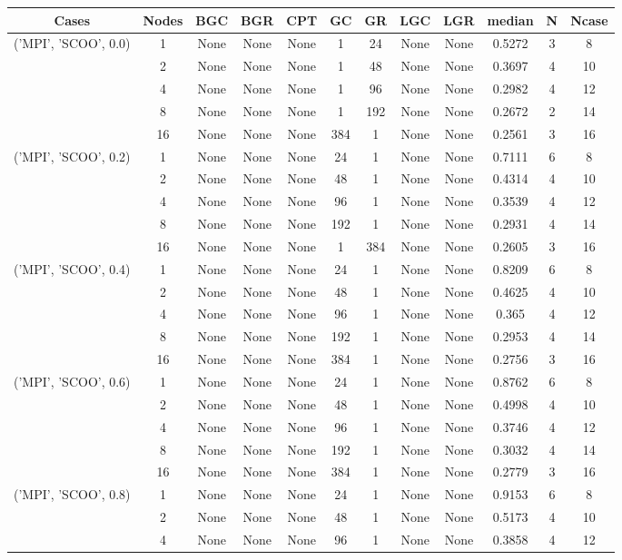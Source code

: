 \begin{tabular}{cccccccccccc}
\hline
Cases & Nodes& BGC& BGR& CPT& GC& GR& LGC& LGR& median & N & Ncase \\
\hline
\multirow{5}{*}{('MPI', 'SCOO', 0.0)}& 1& None& None& None& 1& 24& None& None& 0.5272& 3& 8\\
& 2& None& None& None& 1& 48& None& None& 0.3697& 4& 10\\
& 4& None& None& None& 1& 96& None& None& 0.2982& 4& 12\\
& 8& None& None& None& 1& 192& None& None& 0.2672& 2& 14\\
& 16& None& None& None& 384& 1& None& None& 0.2561& 3& 16\\
\hline
\multirow{5}{*}{('MPI', 'SCOO', 0.2)}& 1& None& None& None& 24& 1& None& None& 0.7111& 6& 8\\
& 2& None& None& None& 48& 1& None& None& 0.4314& 4& 10\\
& 4& None& None& None& 96& 1& None& None& 0.3539& 4& 12\\
& 8& None& None& None& 192& 1& None& None& 0.2931& 4& 14\\
& 16& None& None& None& 1& 384& None& None& 0.2605& 3& 16\\
\hline
\multirow{5}{*}{('MPI', 'SCOO', 0.4)}& 1& None& None& None& 24& 1& None& None& 0.8209& 6& 8\\
& 2& None& None& None& 48& 1& None& None& 0.4625& 4& 10\\
& 4& None& None& None& 96& 1& None& None& 0.365& 4& 12\\
& 8& None& None& None& 192& 1& None& None& 0.2953& 4& 14\\
& 16& None& None& None& 384& 1& None& None& 0.2756& 3& 16\\
\hline
\multirow{5}{*}{('MPI', 'SCOO', 0.6)}& 1& None& None& None& 24& 1& None& None& 0.8762& 6& 8\\
& 2& None& None& None& 48& 1& None& None& 0.4998& 4& 10\\
& 4& None& None& None& 96& 1& None& None& 0.3746& 4& 12\\
& 8& None& None& None& 192& 1& None& None& 0.3032& 4& 14\\
& 16& None& None& None& 384& 1& None& None& 0.2779& 3& 16\\
\hline
\multirow{5}{*}{('MPI', 'SCOO', 0.8)}& 1& None& None& None& 24& 1& None& None& 0.9153& 6& 8\\
& 2& None& None& None& 48& 1& None& None& 0.5173& 4& 10\\
& 4& None& None& None& 96& 1& None& None& 0.3858& 4& 12\\

\end{tabular}

